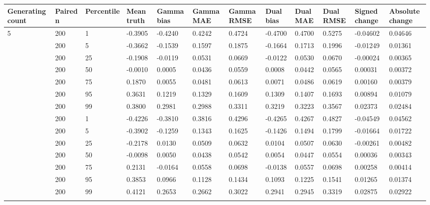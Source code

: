 \begin{longtable}{llllllllllll}
\toprule
Generating count & Paired n & Percentile & Mean truth & Gamma bias & Gamma MAE & Gamma RMSE & Dual bias & Dual MAE & Dual RMSE & Signed change & Absolute change \\
\midrule\endhead
5 & 200 & 1 & -0.3905 & -0.4240 & 0.4242 & 0.4724 & -0.4700 & 0.4700 & 0.5275 & -0.04602 & 0.04646 \\ \addlinespace[3pt]
5 & 200 & 5 & -0.3662 & -0.1539 & 0.1597 & 0.1875 & -0.1664 & 0.1713 & 0.1996 & -0.01249 & 0.01361 \\ \addlinespace[3pt]
5 & 200 & 25 & -0.1908 & -0.0119 & 0.0531 & 0.0669 & -0.0122 & 0.0530 & 0.0670 & -0.00024 & 0.00365 \\ \addlinespace[3pt]
5 & 200 & 50 & -0.0010 & 0.0005 & 0.0436 & 0.0559 & 0.0008 & 0.0442 & 0.0565 & 0.00031 & 0.00372 \\ \addlinespace[3pt]
5 & 200 & 75 & 0.1870 & 0.0055 & 0.0481 & 0.0613 & 0.0071 & 0.0486 & 0.0619 & 0.00160 & 0.00379 \\ \addlinespace[3pt]
5 & 200 & 95 & 0.3631 & 0.1219 & 0.1329 & 0.1609 & 0.1309 & 0.1407 & 0.1693 & 0.00894 & 0.01079 \\ \addlinespace[3pt]
5 & 200 & 99 & 0.3800 & 0.2981 & 0.2988 & 0.3311 & 0.3219 & 0.3223 & 0.3567 & 0.02373 & 0.02484 \\ \addlinespace[3pt]
10 & 200 & 1 & -0.4226 & -0.3810 & 0.3816 & 0.4296 & -0.4265 & 0.4267 & 0.4827 & -0.04549 & 0.04562 \\ \addlinespace[3pt]
10 & 200 & 5 & -0.3902 & -0.1259 & 0.1343 & 0.1625 & -0.1426 & 0.1494 & 0.1799 & -0.01664 & 0.01722 \\ \addlinespace[3pt]
10 & 200 & 25 & -0.2178 & 0.0130 & 0.0509 & 0.0632 & 0.0104 & 0.0507 & 0.0630 & -0.00261 & 0.00482 \\ \addlinespace[3pt]
10 & 200 & 50 & -0.0098 & 0.0050 & 0.0438 & 0.0542 & 0.0054 & 0.0447 & 0.0554 & 0.00036 & 0.00343 \\ \addlinespace[3pt]
10 & 200 & 75 & 0.2131 & -0.0164 & 0.0558 & 0.0698 & -0.0138 & 0.0557 & 0.0698 & 0.00258 & 0.00414 \\ \addlinespace[3pt]
10 & 200 & 95 & 0.3853 & 0.0966 & 0.1128 & 0.1434 & 0.1093 & 0.1225 & 0.1541 & 0.01265 & 0.01374 \\ \addlinespace[3pt]
10 & 200 & 99 & 0.4121 & 0.2653 & 0.2662 & 0.3022 & 0.2941 & 0.2945 & 0.3319 & 0.02875 & 0.02922 \\ \addlinespace[3pt]

\end{longtable}
